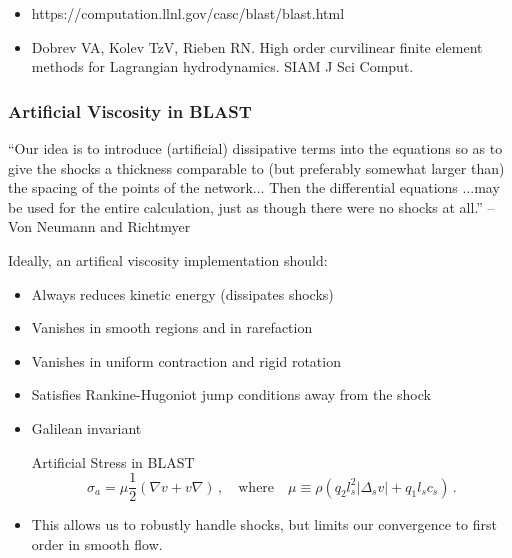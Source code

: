 \documentclass[8pt,xcolor=svgnames]{beamer}
\begin{document}
\begin{frame}
\begin{itemize}
\item \tiny{ https://computation.llnl.gov/casc/blast/blast.html}
\item \tiny{ Dobrev VA, Kolev TzV, Rieben RN. High order curvilinear finite element methods for Lagrangian hydrodynamics. SIAM J Sci Comput.}
\end{itemize}
\end{frame}


\begin{frame}\frametitle{Artificial Viscosity in BLAST}
\begin{block}{}
{\small``Our idea is to introduce (artificial) dissipative terms into the
equations so as to give the shocks a thickness comparable to (but preferably
somewhat larger than) the spacing of the points of the network... Then the
differential equations ...may be used for the entire calculation, just as
though there were no shocks at all.'' -- Von Neumann and Richtmyer}\\
\end{block}
\bigskip

Ideally, an artifical viscosity implementation should:
\begin{itemize}
  \item Always reduces kinetic energy (dissipates shocks)
  \item Vanishes in smooth regions and in rarefaction
  \item Vanishes in uniform contraction and rigid rotation
  \item Satisfies Rankine-Hugoniot jump conditions away from the shock
  \item Galilean invariant

\bigskip
\begin{block}{Artificial Stress in BLAST}
\[
\sigma_a = \mu\frac{1}{2}(\nabla v+v\nabla)\,,\quad\text{where}\quad
\mu\equiv\rho(q_2l_s^2|\Delta_sv|+q_1l_sc_s)\,.
\]
\end{block}
\item This allows us to robustly handle shocks, but limits our convergence to first order in smooth flow.
\end{itemize}
\end{frame}
\end{document}

